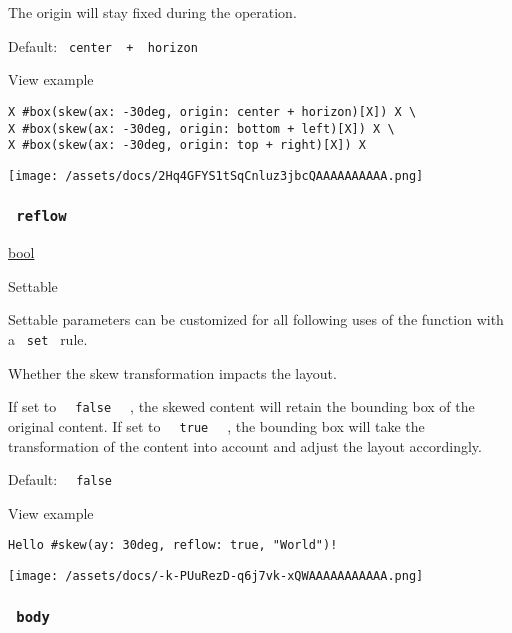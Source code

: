 The origin will stay fixed during the operation.

Default: \texttt{\ center\ }{\texttt{\ +\ }}\texttt{\ horizon\ }


View example

\begin{verbatim}
X #box(skew(ax: -30deg, origin: center + horizon)[X]) X \
X #box(skew(ax: -30deg, origin: bottom + left)[X]) X \
X #box(skew(ax: -30deg, origin: top + right)[X]) X
\end{verbatim}

\texttt{[image: /assets/docs/2Hq4GFYS1tSqCnluz3jbcQAAAAAAAAAA.png]}

\subsubsection{\texorpdfstring{\texttt{\ reflow\ }}{ reflow }}\label{parameters-reflow}

\href{/docs/reference/foundations/bool/}{bool}

{{ Settable }}

\label{parameters-reflow-settable-tooltip}
Settable parameters can be customized for all following uses of the
function with a \texttt{\ set\ } rule.

Whether the skew transformation impacts the layout.

If set to \texttt{\ }{\texttt{\ false\ }}\texttt{\ } , the skewed
content will retain the bounding box of the original content. If set to
\texttt{\ }{\texttt{\ true\ }}\texttt{\ } , the bounding box will take
the transformation of the content into account and adjust the layout
accordingly.

Default: \texttt{\ }{\texttt{\ false\ }}\texttt{\ }


View example

\begin{verbatim}
Hello #skew(ay: 30deg, reflow: true, "World")!
\end{verbatim}

\texttt{[image: /assets/docs/-k-PUuRezD-q6j7vk-xQWAAAAAAAAAAA.png]}

\subsubsection{\texorpdfstring{\texttt{\ body\ }}{ body }}\label{parameters-body}

